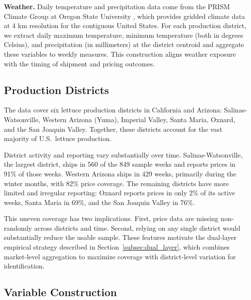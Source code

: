 \documentclass[12pt]{article}
\begin{document}
\textbf{Weather.} Daily temperature and precipitation data come from the PRISM Climate Group at Oregon State University \citep{daly2008prism}, which provides gridded climate data at 4 km resolution for the contiguous United States. For each production district, we extract daily maximum temperature, minimum temperature (both in degrees Celsius), and precipitation (in millimeters) at the district centroid and aggregate these variables to weekly measures. This construction aligns weather exposure with the timing of shipment and pricing outcomes.

\subsection{Production Districts}
\label{subsec:districts}

The data cover six lettuce production districts in California and Arizona: Salinas-Watsonville, Western Arizona (Yuma), Imperial Valley, Santa Maria, Oxnard, and the San Joaquin Valley. Together, these districts account for the vast majority of U.S.\ lettuce production.

District activity and reporting vary substantially over time. Salinas-Watsonville, the largest district, ships in 560 of the 849 sample weeks and reports prices in 91\% of those weeks. Western Arizona ships in 429 weeks, primarily during the winter months, with 82\% price coverage. The remaining districts have more limited and irregular reporting: Oxnard reports prices in only 2\% of its active weeks, Santa Maria in 69\%, and the San Joaquin Valley in 76\%.

This uneven coverage has two implications. First, price data are missing non-randomly across districts and time. Second, relying on any single district would substantially reduce the usable sample. These features motivate the dual-layer empirical strategy described in Section~\ref{subsec:dual_layer}, which combines market-level aggregation to maximize coverage with district-level variation for identification.

\subsection{Variable Construction}
\label{subsec:construction}
\end{document}
